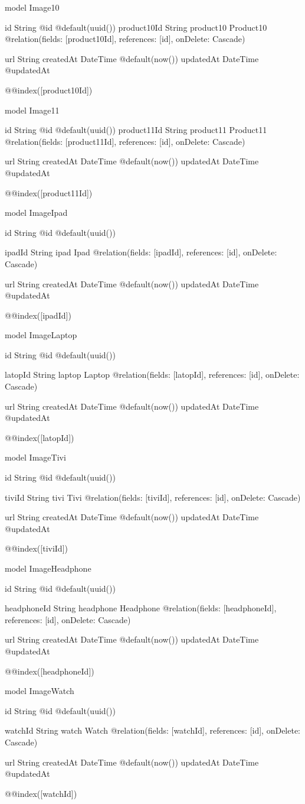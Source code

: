 model Image10 {
  id         String   @id @default(uuid())
  product10Id String
  product10   Product10 @relation(fields: [product10Id], references: [id], onDelete: Cascade)

  url       String
  createdAt DateTime @default(now())
  updatedAt DateTime @updatedAt

  @@index([product10Id])
}

model Image11 {
  id         String   @id @default(uuid())
  product11Id String
  product11   Product11 @relation(fields: [product11Id], references: [id], onDelete: Cascade)

  url       String
  createdAt DateTime @default(now())
  updatedAt DateTime @updatedAt

  @@index([product11Id])
}

model ImageIpad {
  id String @id @default(uuid())

  ipadId String
  ipad   Ipad   @relation(fields: [ipadId], references: [id], onDelete: Cascade)

  url       String
  createdAt DateTime @default(now())
  updatedAt DateTime @updatedAt

  @@index([ipadId])
}

model ImageLaptop {
  id String @id @default(uuid())

  latopId String
  laptop  Laptop @relation(fields: [latopId], references: [id], onDelete: Cascade)

  url       String
  createdAt DateTime @default(now())
  updatedAt DateTime @updatedAt

  @@index([latopId])
}

model ImageTivi {
  id String @id @default(uuid())

  tiviId String
  tivi   Tivi   @relation(fields: [tiviId], references: [id], onDelete: Cascade)

  url       String
  createdAt DateTime @default(now())
  updatedAt DateTime @updatedAt

  @@index([tiviId])
}

model ImageHeadphone {
  id String @id @default(uuid())

  headphoneId String
  headphone   Headphone @relation(fields: [headphoneId], references: [id], onDelete: Cascade)

  url       String
  createdAt DateTime @default(now())
  updatedAt DateTime @updatedAt

  @@index([headphoneId])
}

model ImageWatch {
  id String @id @default(uuid())

  watchId String
  watch   Watch  @relation(fields: [watchId], references: [id], onDelete: Cascade)

  url       String
  createdAt DateTime @default(now())
  updatedAt DateTime @updatedAt

  @@index([watchId])
}

